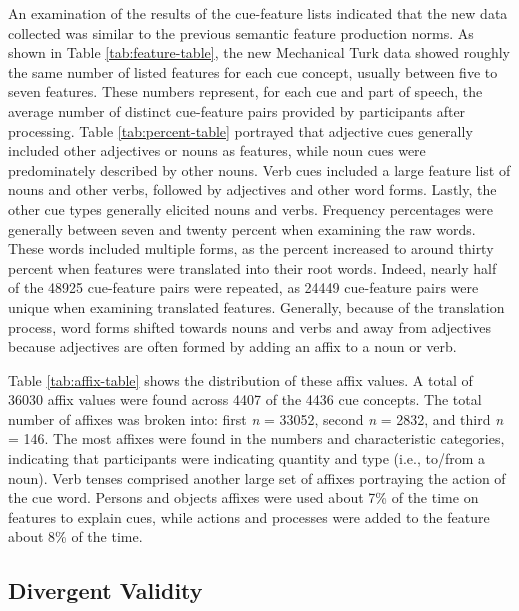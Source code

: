 \documentclass[english,,man]{apa6}
\begin{document}
An examination of the results of the cue-feature lists indicated that the new data collected was similar to the previous semantic feature production norms. As shown in Table \ref{tab:feature-table}, the new Mechanical Turk data showed roughly the same number of listed features for each cue concept, usually between five to seven features. These numbers represent, for each cue and part of speech, the average number of distinct cue-feature pairs provided by participants after processing. Table \ref{tab:percent-table} portrayed that adjective cues generally included other adjectives or nouns as features, while noun cues were predominately described by other nouns. Verb cues included a large feature list of nouns and other verbs, followed by adjectives and other word forms. Lastly, the other cue types generally elicited nouns and verbs. Frequency percentages were generally between seven and twenty percent when examining the raw words. These words included multiple forms, as the percent increased to around thirty percent when features were translated into their root words. Indeed, nearly half of the 48925 cue-feature pairs were repeated, as 24449 cue-feature pairs were unique when examining translated features. Generally, because of the translation process, word forms shifted towards nouns and verbs and away from adjectives because adjectives are often formed by adding an affix to a noun or verb.

Table \ref{tab:affix-table} shows the distribution of these affix values. A total of 36030 affix values were found across 4407 of the 4436 cue concepts. The total number of affixes was broken into: first \emph{n} = 33052, second \emph{n} = 2832, and third \emph{n} = 146. The most affixes were found in the numbers and characteristic categories, indicating that participants were indicating quantity and type (i.e., to/from a noun). Verb tenses comprised another large set of affixes portraying the action of the cue word. Persons and objects affixes were used about 7\% of the time on features to explain cues, while actions and processes were added to the feature about 8\% of the time.

\hypertarget{divergent-validity}{%
\subsection{Divergent Validity}\label{divergent-validity}}
\end{document}
